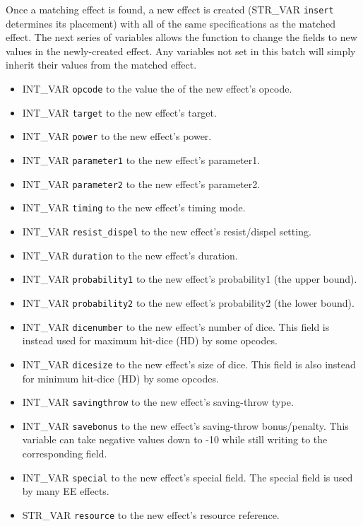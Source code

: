 \documentclass{article}
\begin{document}
Once a matching effect is found, a new effect is created (STR_VAR \verb+insert+ determines its placement) with all of the same specifications as the matched effect. The next series of variables allows the function to change the fields to new values in the newly-created effect. Any variables not set in this batch will simply inherit their values from the matched effect.

\begin{itemize}
\item INT_VAR \verb+opcode+ to the value the of the new effect's opcode.
\item INT_VAR \verb+target+ to the new effect's target.
\item INT_VAR \verb+power+ to the new effect's power.
\item INT_VAR \verb+parameter1+ to the new effect's parameter1.
\item INT_VAR \verb+parameter2+ to the new effect's parameter2.
\item INT_VAR \verb+timing+ to the new effect's timing mode.
\item INT_VAR \verb+resist_dispel+ to the new effect's resist/dispel setting.
\item INT_VAR \verb+duration+ to the new effect's duration.
\item INT_VAR \verb+probability1+ to the new effect's probability1 (the upper bound).
\item INT_VAR \verb+probability2+ to the new effect's probability2 (the lower bound).
\item INT_VAR \verb+dicenumber+ to the new effect's number of dice. This field is instead used for maximum hit-dice (HD) by some opcodes.
\item INT_VAR \verb+dicesize+ to the new effect's size of dice. This field is also instead for minimum hit-dice (HD) by some opcodes.
\item INT_VAR \verb+savingthrow+ to the new effect's saving-throw type.
\item INT_VAR \verb+savebonus+ to the new effect's saving-throw bonus/penalty. This variable can take negative values down to -10 while still writing to the corresponding field.
\item INT_VAR \verb+special+ to the new effect's special field. The special field is used by many EE effects.
\item STR_VAR \verb+resource+ to the new effect's resource reference.
\end{itemize}
\\
\end{document}

